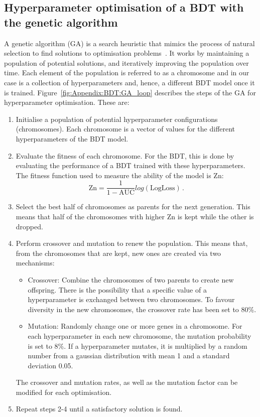 \subsection{Hyperparameter optimisation of a BDT with the genetic algorithm}
\label{chap:Appendix:BDT:GA}
A genetic algorithm (GA) is a search heuristic that mimics the process of natural 
selection to find solutions to optimisation problems~\cite{MitchellGA}. 
It works by maintaining a population 
of potential solutions, and iteratively improving the population over time.
Each element of the population is referred to as a chromosome and in our case is
a collection of hyperparameters and, hence, a different BDT model once it is trained. Figure~\ref{fig:Appendix:BDT:GA_loop}
describes the steps of the GA for hyperparameter optimisation. These are:
\begin{enumerate}
	\item Initialise a population of potential hyperparameter configurations (chromosomes). 
	Each chromosome is a vector of values for the different hyperparameters of the BDT model.
	
	\item Evaluate the fitness of each chromosome. For the BDT, this is done by evaluating the
	performance of a BDT trained with these hyperparameters. The fitness function used to
	measure the ability of the model is Zn:
	\begin{equation*}
		\text{Zn} = \frac{1}{1-\text{AUC}}log(\text{LogLoss})\, .
	\end{equation*}
	
	\item Select the best half of chromosomes as parents for the next generation. 
	This means that half of the chromosomes with higher Zn is kept while the other
	is dropped. 
	
	\item Perform crossover and mutation to renew the population. This means
	that, from the chromosomes that are kept, new ones are created via two
	mechanisms:
	\begin{itemize}
		\item Crossover: Combine the chromosomes of two parents to create new offspring.
		There is the possibility that a specific value of a hyperparameter is exchanged between
		two chromosomes. To favour diversity in the new chromosomes, the crossover rate has been set
		to 80\%. 
		\item Mutation: Randomly change one or more genes in a chromosome. For each 
		hyperparameter in each new chromosome, the mutation probability is set to 8\%.
		If a hyperparameter mutates, it is multiplied by a random number from
		a gaussian distribution with mean 1 and a standard deviation 0.05.
	\end{itemize}
	The crossover and mutation rates, as well as the mutation factor can be modified for each optimisation.
	\item Repeat steps 2-4 until a satisfactory solution is found.
\end{enumerate}



